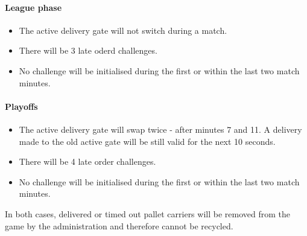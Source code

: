 \documentclass[12pt,twoside]{article}
\begin{document}
\paragraph{League phase}
\begin{itemize}
\item The active delivery gate will not switch during a match.
\item There will be 3 late oderd challenges.
\item No challenge will be initialised during the first or within the
  last two match minutes.
\end{itemize} 


\paragraph{Playoffs}
\begin{itemize}
\item The active delivery gate will swap twice - after minutes 7
  and 11. A delivery made to the old active gate will be still
  valid for the next 10 seconds.
\item There will be 4 late order challenges. 
\item No challenge will be initialised during the first or within
  the last two match minutes.
\end{itemize}    


In both cases, delivered or timed out pallet carriers will be removed
from the game by the administration and therefore cannot be recycled.
\end{document}
